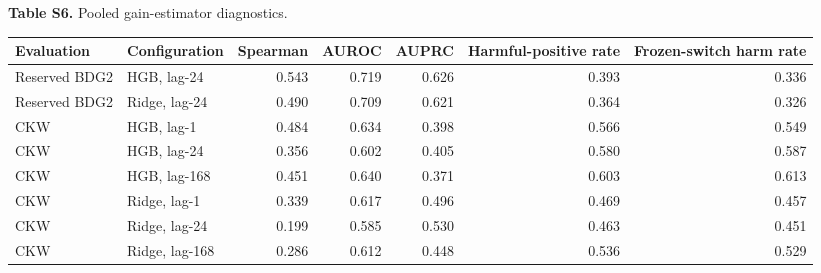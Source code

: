 \textbf{Table S6.} Pooled gain-estimator diagnostics.\\[3pt]
\begin{tabularx}{\textwidth}{llrrrrr}
\toprule
Evaluation & Configuration & Spearman & AUROC & AUPRC & Harmful-positive rate & Frozen-switch harm rate \\
\midrule
Reserved BDG2 & HGB, lag-24 & 0.543 & 0.719 & 0.626 & 0.393 & 0.336 \\
Reserved BDG2 & Ridge, lag-24 & 0.490 & 0.709 & 0.621 & 0.364 & 0.326 \\
CKW & HGB, lag-1 & 0.484 & 0.634 & 0.398 & 0.566 & 0.549 \\
CKW & HGB, lag-24 & 0.356 & 0.602 & 0.405 & 0.580 & 0.587 \\
CKW & HGB, lag-168 & 0.451 & 0.640 & 0.371 & 0.603 & 0.613 \\
CKW & Ridge, lag-1 & 0.339 & 0.617 & 0.496 & 0.469 & 0.457 \\
CKW & Ridge, lag-24 & 0.199 & 0.585 & 0.530 & 0.463 & 0.451 \\
CKW & Ridge, lag-168 & 0.286 & 0.612 & 0.448 & 0.536 & 0.529 \\
\bottomrule
\end{tabularx}
